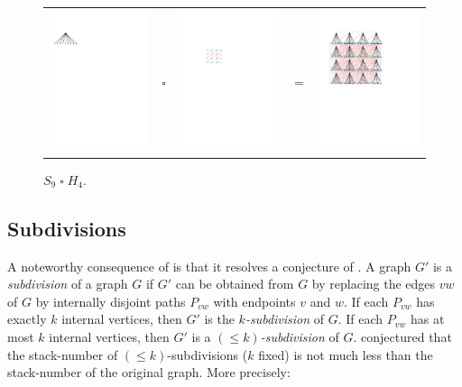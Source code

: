 \documentclass[kpfonts]{patmorin}
\renewcommand{\leq}{\leqslant}
\newcommand{\CartProd}{\mathbin{\square}}
\begin{document}
\begin{figure}
	\begin{center}
		\begin{tabular}{m{}m{2ex}m{}m{2ex}m{}}
			\includegraphics[width=.25\textwidth]{figs/s} & $\CartProd$ & \includegraphics[width=.25\textwidth]{figs/q} & $=$
			& \includegraphics[width=.3\textwidth]{figs/product}
		\end{tabular}
	\end{center}
	\caption{$S_9 \CartProd H_4$.}
	\label{graph}
\end{figure}


\subsection*{Subdivisions}

A noteworthy consequence of  is that it resolves a conjecture of \citet{BO99}. A graph $G'$ is a \textit{subdivision} of a graph $G$ if $G'$ can be obtained from $G$ by replacing the edges $vw$ of $G$ by internally disjoint paths $P_{vw}$ with endpoints $v$ and $w$. If each $P_{vw}$ has exactly $k$ internal vertices, then $G'$ is the \emph{$k$-subdivision} of $G$. If each $P_{vw}$ has at most $k$ internal vertices, then $G'$ is a \emph{$(\leq k)$-subdivision} of $G$. \citet{BO99} conjectured that the stack-number of $(\leq k)$-subdivisions ($k$ fixed)  is not much less than the stack-number of the original graph. More precisely:
\end{document}
